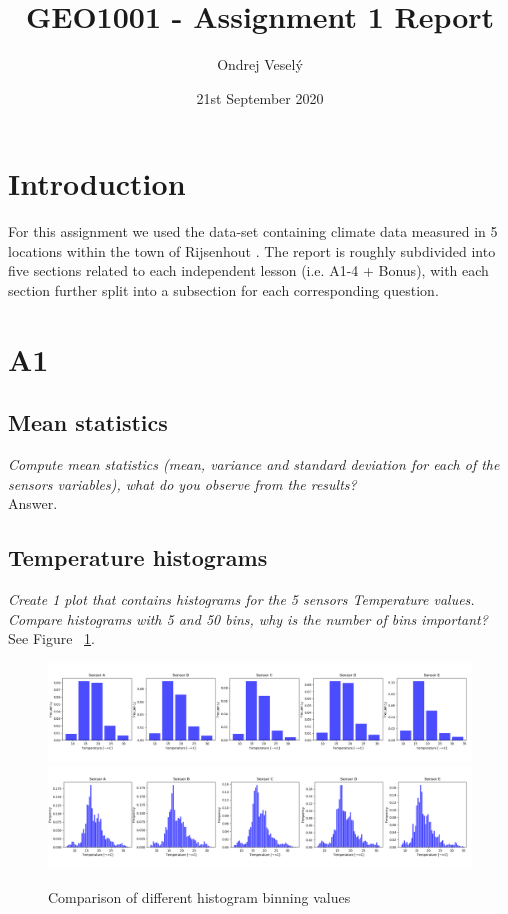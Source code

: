 \documentclass{article}
\title{GEO1001 - Assignment 1 Report}
\author{Ondrej Veselý}
\date{21st September 2020}
\begin{document}
\maketitle

\section*{Introduction}
For this assignment we used the data-set containing climate data measured in 5 locations within the town of Rijsenhout \citep{data}. The report is roughly subdivided into five sections related to each independent lesson (i.e. A1-4 + Bonus), with each section further split into a subsection for each corresponding question.

\newpage

\section{A1}

\subsection{Mean statistics}
\textit{
Compute mean statistics (mean, variance and standard deviation for each of the sensors variables), what do you observe from the results?
}\\

Answer.

\subsection{Temperature histograms}
\textit{
Create 1 plot that contains histograms for the 5 sensors Temperature values. Compare histograms with 5 and 50 bins, why is the number of bins important?
}\\

See Figure ~\ref{fig:1-2}.

\begin{figure}[!htb]
\centering
\includegraphics[width=\textwidth]{1-2-5_bins.png}
\includegraphics[width=\textwidth]{1-2-50_bins.png}
\caption{Comparison of different histogram binning values}
\label{fig:1-2}
\end{figure}
\end{document}
